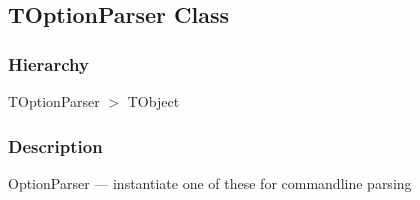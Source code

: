 \documentclass{report}
\begin{document}
\subsection*{TOptionParser Class}
\fi
\label{PasDoc_OptionParser.TOptionParser}
\subsubsection*{\large{\textbf{Hierarchy}}\normalsize\hspace{1ex}\hfill}
TOptionParser {$>$} TObject
\subsubsection*{\large{\textbf{Description}}\normalsize\hspace{1ex}\hfill}
OptionParser --- instantiate one of these for commandline parsing\hfill\vspace*{1ex}
\end{document}

